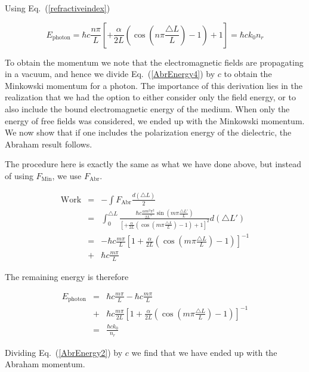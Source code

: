 Using Eq.\ (\ref{refractiveindex})

\begin{equation}
E_{\mathrm{photon}}=\hbar c\frac{n\pi}{L}\left[+\frac{\alpha}{2L}\left(\cos(n\pi\frac{\triangle L}{L})-1\right)+1\right]=\hbar ck_{0}n_{r}
\label{AbrEnergy4}
\end{equation}


To obtain the momentum we note that the electromagnetic fields are propagating in a vacuum, and hence we divide Eq.\ (\ref{AbrEnergy4}) by $c$ to obtain the Minkowski momentum for a photon. The
importance of this derivation lies in the realization that we had the option
to either consider only the field energy, or to also include the bound electromagnetic energy of the medium. When only the energy of free fields was considered,
we ended up with the Minkowski momentum. We now show that if
one includes the polarization energy of the dielectric, the Abraham result follows.




The procedure here is exactly the same as what we have done above, but instead of using $F_{\mathrm{Min}}$, we use $F_{\mathrm{Abr}}$.


\begin{eqnarray}
\mathrm{Work}&=&-\int F_{\mathrm{Abr}}\frac{d\left(\triangle L\right)}{2}\nonumber \\
&=&\int_{0}^{\triangle L}\frac{\hbar c\frac{\alpha m^{2}\pi^{2}}{2L^{3}}\sin(m\pi\frac{\triangle L'}{L})}{\left[+\frac{\alpha}{2L}\left(\cos(m\pi\frac{\triangle L}{L})-1\right)+1\right]^{2}}d\left(\triangle L'\right) \nonumber \\
&=&-\hbar c\frac{m\pi}{L}\left[1+\frac{\alpha}{2L}\left(\cos(m\pi\frac{\triangle L}{L})-1\right)\right]^{-1} \nonumber \\
&+&\hbar c\frac{m\pi}{L}
\label{AbrEnergy1}
\end{eqnarray}


The remaining energy is therefore

\begin{eqnarray}
E_{\mathrm{photon}}&=&\hbar c\frac{m\pi}{L} -\hbar c\frac{m\pi}{L}\nonumber \\
&+&\hbar c\frac{m\pi}{2L}\left[1+\frac{\alpha}{2L}\left(\cos(m\pi\frac{\triangle L}{L})-1\right)\right]^{-1}\nonumber \\
&=&\frac{\hbar ck_{0}}{n_{r}}
\label{AbrEnergy2}
\end{eqnarray}


Dividing Eq.\ (\ref{AbrEnergy2}) by $c$ we find that we have ended up with the Abraham momentum.

